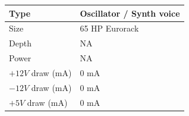 \documentclass[12pt,letter]{article}
\begin{document}
\begin{table}[!htp]
\begin{tabular}{|l|l|}
\hline
Type             & Oscillator / Synth voice \\
\hline
Size             & 65 HP Eurorack           \\
\hline
Depth            & NA                       \\
\hline
Power            & NA                       \\ %
\hline
$+12V$ draw (mA) & 0 mA                     \\
\hline
$-12V$ draw (mA) & 0 mA                     \\
\hline
$+5V$ draw (mA)  & 0 mA                     \\
\hline
\end{tabular}
\end{table}


\clearpage
\renewcommand\refname{References \& Acknowledgments}
\nocite{*}


\end{document}
